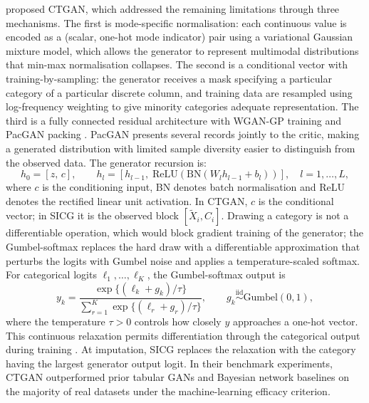 \citet{xu2019modeling} proposed CTGAN, which addressed the remaining limitations through three mechanisms. The first is mode-specific normalisation: each continuous value is encoded as a (scalar, one-hot mode indicator) pair using a variational Gaussian mixture model, which allows the generator to represent multimodal distributions that min-max normalisation collapses. The second is a conditional vector with training-by-sampling: the generator receives a mask specifying a particular category of a particular discrete column, and training data are resampled using log-frequency weighting to give minority categories adequate representation. The third is a fully connected residual architecture with WGAN-GP training and PacGAN packing \citep{lin2018pacgan}. PacGAN presents several records jointly to the critic, making a generated distribution with limited sample diversity easier to distinguish from the observed data. The generator recursion is:
\begin{equation}
h_0 = [z,\, c], \qquad h_l = [h_{l-1},\; \text{ReLU}(\text{BN}(W_l h_{l-1} + b_l))], \quad l = 1, \ldots, L,
\label{eq:ctgan-generator}
\end{equation}
where $c$ is the conditioning input, BN denotes batch normalisation and ReLU denotes the rectified linear unit activation. In CTGAN, $c$ is the conditional vector; in SICG it is the observed block $[\tilde{X}_i,C_i]$. Drawing a category is not a differentiable operation, which would block gradient training of the generator; the Gumbel-softmax replaces the hard draw with a differentiable approximation that perturbs the logits with Gumbel noise and applies a temperature-scaled softmax. For categorical logits $\ell_1,\ldots,\ell_K$, the Gumbel-softmax output is
\begin{equation}
y_k=\frac{\exp\{(\ell_k+g_k)/\tau\}}{\sum_{r=1}^K\exp\{(\ell_r+g_r)/\tau\}},
\qquad g_k\stackrel{\mathrm{iid}}{\sim}\mathrm{Gumbel}(0,1),
\label{eq:sicg_gumbel}
\end{equation}
where the temperature $\tau>0$ controls how closely $y$ approaches a one-hot vector. This continuous relaxation permits differentiation through the categorical output during training \citep{jang2017categorical}. At imputation, SICG replaces the relaxation with the category having the largest generator output logit. In their benchmark experiments, CTGAN outperformed prior tabular GANs and Bayesian network baselines on the majority of real datasets under the machine-learning efficacy criterion.

